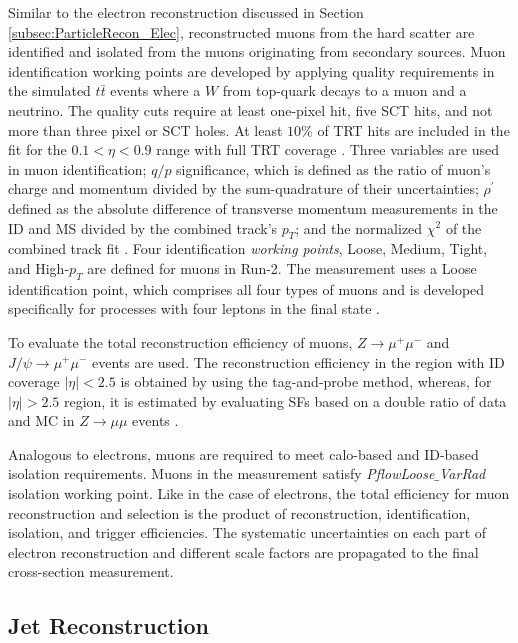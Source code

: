 Similar to the electron reconstruction discussed in Section \ref{subsec:ParticleRecon_Elec}, reconstructed muons from the hard scatter are identified and isolated from the muons originating from secondary sources. Muon identification working points are developed by applying quality requirements in the simulated $t\bar{t}$ events where a $W$ from top-quark decays to a muon and a neutrino. The quality cuts require at least one-pixel hit, five SCT hits, and not more than three pixel or SCT holes. At least $10\%$ of TRT hits are included in the fit for the $0.1<\eta<0.9$ range with full TRT coverage \cite{MuonReco}. Three variables are used in muon identification; $q/p$ significance, which is defined as the ratio of muon's charge and momentum divided by the sum-quadrature of their uncertainties; $\rho^{'}$ defined as the absolute difference of transverse momentum measurements in the ID and MS divided by the combined track's $p_{T}$; and the normalized $\chi ^{2}$ of the combined track fit \cite{MuonReco}. 
Four identification \textit{working points}, Loose, Medium, Tight, and High-$p_{T}$ are defined for muons in Run-2. The measurement uses a Loose identification point, which comprises all four types of muons and is developed specifically for processes with four leptons in the final state  \cite{MuonReco}. 

To evaluate the total reconstruction efficiency of muons, $Z \rightarrow \mu^{+}\mu^{-}$ and $J/\psi \rightarrow \mu^{+}\mu^{-}$ events are used. The reconstruction efficiency in the region with ID coverage $|\eta|<2.5$ is obtained by using the tag-and-probe method, whereas, for $|\eta|>2.5$ region, it is estimated by evaluating SFs based on a double ratio of data and MC in $Z \rightarrow \mu\mu$ events \cite{MuonEffLargeEta}.

Analogous to electrons, muons are required to meet calo-based and ID-based isolation requirements. Muons in the measurement satisfy \textit{PflowLoose$\_$VarRad} isolation working point. Like in the case of electrons, the total efficiency for muon reconstruction and selection is the product of reconstruction, identification, isolation, and trigger efficiencies. The systematic uncertainties on each part of electron reconstruction and different scale factors are propagated to the final cross-section measurement.

\subsection{Jet Reconstruction}
\label{subsec:ParticleRecon_Jets}


